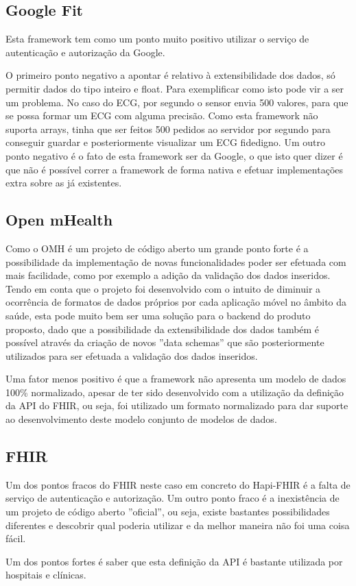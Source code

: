 \subsection{Google Fit}
Esta framework tem como um ponto muito positivo utilizar o serviço de autenticação e autorização da Google.\par 
O primeiro ponto negativo a apontar é relativo à extensibilidade dos dados, só permitir dados do tipo inteiro e float. Para exemplificar como isto pode vir a ser um problema. No caso do \gls{ECG}, por segundo o sensor envia 500 valores, para que se possa formar um \gls{ECG} com alguma precisão. Como esta framework não suporta arrays, tinha que ser feitos 500 pedidos ao servidor por segundo para conseguir guardar e posteriormente visualizar um \gls{ECG} fidedigno. Um outro ponto negativo é o fato de esta framework ser da Google, o que isto quer dizer é que não é possível correr a framework de forma nativa e efetuar implementações extra sobre as já existentes.
\subsection{Open mHealth}
Como o \gls{OMH} é um projeto de código aberto um grande ponto forte é a possibilidade da implementação de novas funcionalidades poder ser efetuada com mais facilidade, como por exemplo a adição da validação dos dados inseridos. Tendo em conta que o projeto foi desenvolvido com o intuito de diminuir a ocorrência de formatos de dados próprios por cada aplicação móvel no âmbito da saúde, esta pode muito bem ser uma solução para o backend do produto proposto, dado que a possibilidade da extensibilidade dos dados também é possível através da criação de novos ''data schemas'' que são posteriormente utilizados para ser efetuada a validação dos dados inseridos.
\par
Uma fator menos positivo é que a framework não apresenta um modelo de dados 100\% normalizado, apesar de ter sido desenvolvido com a utilização da definição da \gls{API} do \gls{FHIR}, ou seja, foi utilizado um formato normalizado para  dar suporte ao desenvolvimento deste modelo conjunto de modelos de dados.
\subsection{FHIR}

Um dos pontos fracos do FHIR neste caso em concreto do Hapi-FHIR é a falta de serviço de autenticação e autorização. Um outro ponto fraco é a inexistência de um projeto de código aberto ''oficial'', ou seja, existe bastantes possibilidades diferentes e descobrir qual poderia utilizar e da melhor maneira não foi uma coisa fácil.
\par
Um dos pontos fortes é saber que esta definição da \gls{API} é bastante utilizada por hospitais e clínicas.
